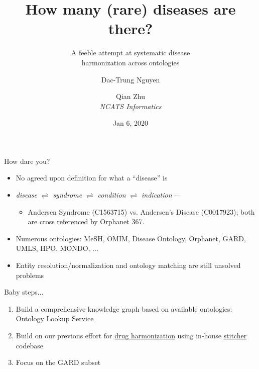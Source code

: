 ﻿\documentclass[anchorcolor=blue,linkcolor=blue]{beamer}
\title{How many (rare) diseases are there?}
\subtitle{A feeble attempt at systematic disease\\
  harmonization across ontologies}
\author{Dac-Trung Nguyen\and Qian Zhu\\[1em] \emph{NCATS Informatics}}
\date{Jan 6, 2020}
\begin{document}
\begin{frame}
  \titlepage
\end{frame}

\begin{frame}
  \begin{block}{How dare you?}
    \begin{itemize}
    \item No agreed upon definition for what a ``disease'' is
    \item \emph{disease} $\rightleftharpoons$ \emph{syndrome}
      $\rightleftharpoons$ \emph{condition} $\rightleftharpoons$
      \emph{indication} $\cdots$
      \begin{itemize}
        \item Andersen Syndrome (C1563715) vs. Andersen's Disease (C0017923); both are cross referenced by Orphanet 367.
      \end{itemize}
    \item Numerous ontologies: MeSH, OMIM, Disease Ontology, Orphanet,
      GARD, UMLS, HPO, MONDO, $\ldots$
    \item Entity resolution/normalization and ontology matching are
      still unsolved problems
    \end{itemize}
  \end{block}
  \begin{block}{Baby steps...}
    \begin{enumerate}
      \item Build a comprehensive knowledge graph based on available
        ontologies: \href{https://www.ebi.ac.uk/ols/ontologies}{Ontology
          Lookup Service}
      \item Build on our previous effort for
        \href{https://stitcher.ncats.io/app/stitches/latest}{drug harmonization} using
        in-house
        \href{https://github.com/ncats/stitcher}{stitcher} codebase
      \item Focus on the GARD subset
    \end{enumerate}
  \end{block}
\end{frame}
\end{document}
